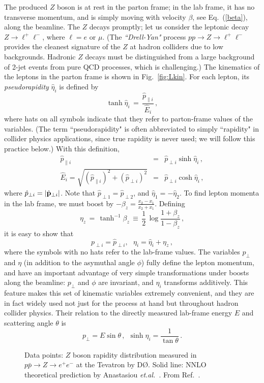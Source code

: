 \documentclass{ws-procs9x6}
\def\beq{\begin{equation}}
\def\eeq#1{\label{#1}\end{equation}}
\def\beqa{\begin{eqnarray}}
\def\eeqa#1{\label{#1}\end{eqnarray}}
\def\CR{\nonumber \\ }
\def\leqn#1{(\ref{#1})}
\def\heta{\hat{\eta}}
\begin{document}
The produced $Z$ boson is at rest in the parton frame; in the lab frame, it has no transverse momentum, and is simply moving with velocity $\beta$, see Eq.~\leqn{beta}, along the beamline.
The $Z$ decays promptly; let us consider the leptonic decay $Z\to \ell^+\ell^-$, where $\ell=e$ or $\mu$. (The {\it ``Drell-Yan"} process $pp\to Z\to \ell^+\ell^-$ provides the cleanest  signature of the $Z$ at hadron colliders due to low backgrounds. Hadronic $Z$ decays must be distinguished from a large background of 2-jet events from pure QCD processes, which is challenging.) The kinematics of the leptons in the parton frame is shown in Fig.~\ref{fig:Lkin}. For each lepton, its {\it pseudorapidity} $\heta_i$ is defined by
\beq
\tanh \hat{\eta}_i \,=\, \frac{\hat{p}_{\parallel i}}{ \hat{E}_i}\,,
\eeq{eta_def}
where hats on all symbols indicate that they refer to parton-frame values of the variables. (The term ``pseudorapidity" is often abbreviated to simply ``rapidity" in collider physics applications, since true rapidity is never used; we will follow this practice below.) With this definition,
\beqa
\hat{p}_{\parallel i} &=& \hat{p}_{\perp i} \sinh \heta_i\,,\CR
\hat{E}_i = \sqrt{(\hat{p}_{\parallel i})^2+(\hat{p}_{\perp i})^2} &=& \hat{p}_{\perp i} \cosh \heta_i\,,
\eeqa{heta}
where $\hat{p}_{\perp i}=|{\hat{\bf p}}_{\perp i}|$.  Note that $\hat{p}_{\perp 1}= \hat{p}_{\perp 2}$, and $\heta_1=-\heta_2$. To find lepton momenta in the lab frame, we must boost by $-\beta_z=\frac{x_2-x_1}{x_2+x_1}$. Defining 
\beq
\eta_z \,=\, \tanh^{-1} \beta_z \,\equiv\, \frac{1}{2}\,\log \frac{1+\beta_z}{1-\beta_z}\,,
\eeq{boost_rap}
it is easy to show that 
\beq
p_{\perp i} = \hat{p}_{\perp i},~~~\eta_i = \heta_i + \eta_z\,,
\eeq{boost}
where the symbols with no hats refer to the lab-frame values. The variables $p_\perp$ and $\eta$ (in addition to the asymuthal angle $\phi$) fully define the lepton momentum, and have an important advantage of very simple transformations under boosts along the beamline: $p_\perp$ and $\phi$ are invariant, and $\eta_i$ transforms additively. This feature makes this set of kinematic variables extremely convenient, and they are in fact widely used not just for the process at hand but throughout hadron collider physics. Their relation to the directly measured lab-frame energy $E$ and scattering angle $\theta$ is 
\beq
p_\perp = E \sin \theta\,,~~\sinh\eta_i = \frac{1}{\tan\theta}\,.
\eeq{rela} 

\begin{figure}
\begin{center}
\end{center}
\caption{Data points: $Z$ boson rapidity distribution measured in $p\bar{p}\to Z\to e^+e^-$ at the Tevatron by D{\O}. Solid line: NNLO theoretical prediction by Anastasiou {\it et.al.}~\cite{Zrap_NNLO}. From Ref.~\cite{D0_Zeta}.}
\label{fig:Zeta}
\end{figure}
\end{document}
